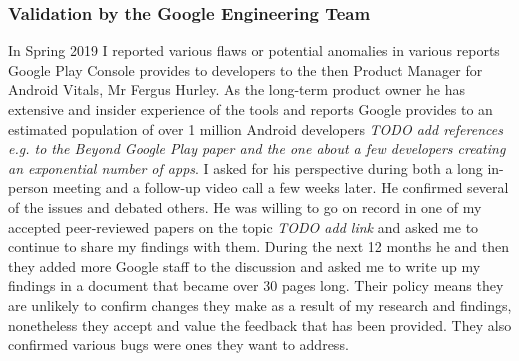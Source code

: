\subsubsection{Validation by the Google Engineering Team}
In Spring 2019 I reported various flaws or potential anomalies in various reports Google Play Console provides to developers to the then Product Manager for Android Vitals, Mr Fergus Hurley. As the long-term product owner he has extensive and insider experience of the tools and reports Google provides to an estimated population of over 1 million Android developers \emph{TODO add references e.g. to the Beyond Google Play paper and the one about a few developers creating an exponential number of apps}. I asked for his perspective during both a long in-person meeting and a follow-up video call a few weeks later. He confirmed several of the issues and debated others. He was willing to go on record in one of my accepted peer-reviewed papers on the topic \emph{TODO add link} and asked me to continue to share my findings with them. During the next 12 months he and then they added more Google staff to the discussion and asked me to write up my findings in a document that became over 30 pages long. Their policy means they are unlikely to confirm changes they make as a result of my research and findings, nonetheless they accept and value the feedback that has been provided. They also confirmed various bugs were ones they want to address.
